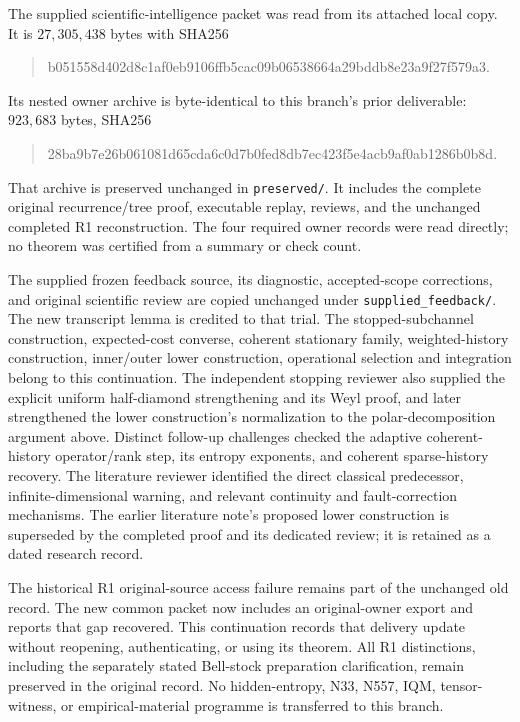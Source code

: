 \documentclass[11pt]{article}
\begin{document}
The supplied scientific-intelligence packet was read from its attached local copy. It is $27{,}305{,}438$ bytes with SHA256
\begin{quote}\ttfamily\small\raggedright
b051558d402d8c1af0eb9106ffb5cac09b06538664a29bddb8e23a9f27f579a3.
\end{quote}
Its nested owner archive is byte-identical to this branch's prior deliverable: $923{,}683$ bytes, SHA256
\begin{quote}\ttfamily\small\raggedright
28ba9b7e26b061081d65cda6c0d7b0fed8db7ec423f5e4acb9af0ab1286b0b8d.
\end{quote}
That archive is preserved unchanged in \texttt{preserved/}. It includes the complete original recurrence/tree proof, executable replay, reviews, and the unchanged completed R1 reconstruction. The four required owner records were read directly; no theorem was certified from a summary or check count.

The supplied frozen feedback source, its diagnostic, accepted-scope corrections, and original scientific review are copied unchanged under \texttt{supplied\_feedback/}. The new transcript lemma is credited to that trial. The stopped-subchannel construction, expected-cost converse, coherent stationary family, weighted-history construction, inner/outer lower construction, operational selection and integration belong to this continuation. The independent stopping reviewer also supplied the explicit uniform half-diamond strengthening and its Weyl proof, and later strengthened the lower construction's normalization to the polar-decomposition argument above. Distinct follow-up challenges checked the adaptive coherent-history operator/rank step, its entropy exponents, and coherent sparse-history recovery. The literature reviewer identified the direct classical predecessor, infinite-dimensional warning, and relevant continuity and fault-correction mechanisms. The earlier literature note's proposed lower construction is superseded by the completed proof and its dedicated review; it is retained as a dated research record.

The historical R1 original-source access failure remains part of the unchanged old record. The new common packet now includes an original-owner export and reports that gap recovered. This continuation records that delivery update without reopening, authenticating, or using its theorem. All R1 distinctions, including the separately stated Bell-stock preparation clarification, remain preserved in the original record. No hidden-entropy, N33, N557, IQM, tensor-witness, or empirical-material programme is transferred to this branch.
\end{document}
